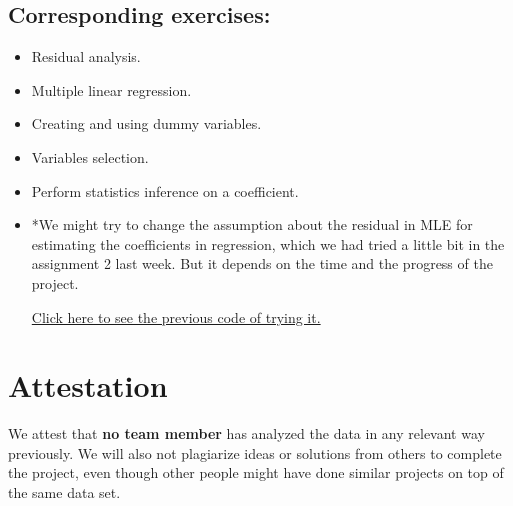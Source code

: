 \documentclass{article}
\begin{document}
\subsection{Corresponding exercises:}
\begin{itemize}
    \item Residual analysis.
    \item Multiple linear regression.
    \item Creating and using dummy variables.
    \item Variables selection.
    \item Perform statistics inference on a coefficient.
    \item *We might try to change the assumption about the residual in MLE for estimating 
    the coefficients in regression, which we had tried a little bit in the assignment 2 last week.
    But it depends on the time and the progress of the project.

    \href{https://github.com/Gufeng-2002/5320_Assignment_2/blob/main/LikelihoodEstimator.ipynb}{Click here to see the previous code of trying it.}
\end{itemize}

\section{Attestation}
We attest that \textbf{no team member} has analyzed the data in any relevant way previously.
We will also not plagiarize ideas or solutions from others to complete the project, even though other people 
might have done similar projects on top of the same data set.
\end{document}
